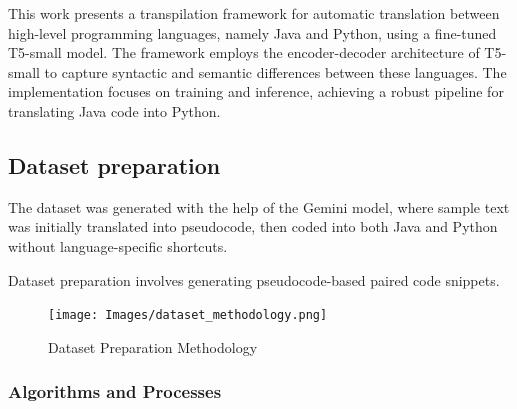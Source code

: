 \documentclass{dhbenelux}
\begin{document}
This work presents a transpilation framework for automatic translation between high-level programming languages, namely Java and Python, using a fine-tuned T5-small model. The framework employs the encoder-decoder architecture of T5-small to capture syntactic and semantic differences between these languages. The implementation focuses on training and inference, achieving a robust pipeline for translating Java code into Python.

\subsection{Dataset preparation}
    The dataset was generated with the help of the Gemini model, where sample text was initially translated into pseudocode, then coded into both Java and Python without language-specific shortcuts.
\begin{enumerate}
    Dataset preparation involves generating pseudocode-based paired code snippets. 
\begin{figure}[h!]
\centering
\texttt{[image: Images/dataset\_methodology.png]} %
\caption{Dataset Preparation Methodology}
\end{figure}
\end{enumerate}
\subsubsection{Algorithms and Processes}
\end{document}
